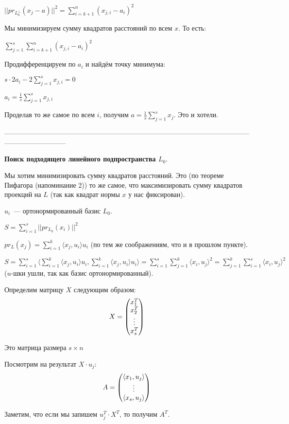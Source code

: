 $||pr_{L_0^{\perp}}(x_j-a)||^2 = \sum\limits_{i = k + 1}^n (x_{j, i} - a_i)^2$

Мы минимизируем сумму квадратов расстояний по всем $x$. То есть:

$\sum\limits_{j = 1}^s \sum\limits_{i = k + 1}^n (x_{j, i} - a_i)^2$

Продифференцируем по $a_i$ и найдём точку минимума:

$s\cdot 2a_i -2\sum\limits_{j=1}^s x_{j, i} = 0$

$a_i = \frac{1}{s} \sum\limits_{j=1}^s x_{j, i}$

Проделав то же самое по всем $i$, получим $a = \frac{1}{s} \sum\limits_{j=1}^s x_j$. Это и хотели.

\ethrm

---------------------------------------------------------------------------------------------------------------------------------------

{\bf Поиск подходящего линейного подпространства $L_0$}.

Мы хотим минимизировать сумму квадратов расстояний. Это (по теореме Пифагора (напоминание 2)) то же самое, что максимизировать сумму квадратов проекций на $L$ (так как квадрат нормы $x$ у нас фиксирован).

$u_i$~--- ортонормированный базис $L_0$.

$S = \sum\limits_{i = 1}^s ||pr_{L_0}(x_i)||^2$

$pr_L(x_j) = \sum\limits_{i = 1}^k \langle x_j, u_i\rangle u_i$ (по тем же соображениям, что и в прошлом пункте).

$S = \sum\limits_{i = 1}^s\langle\sum\limits_{i = 1}^k \langle x_j, u_i\rangle u_i, \sum\limits_{i = 1}^k \langle x_j, u_i\rangle u_i\rangle = \sum\limits_{i = 1}^s\sum\limits_{j = 1}^k \langle x_i, u_j\rangle^2 = \sum\limits_{j = 1}^k\sum\limits_{i = 1}^s \langle x_i, u_j\rangle^2$ ($u$-шки ушли, так как базис ортонормированный).

Определим матрицу $X$ следующим образом:
$$
X = \begin{pmatrix}
x_1^T\\
x_2^T\\
\vdots\\
x_s^T
\end{pmatrix}
$$

Это матрица размера $s\times n$

Посмотрим на результат $X\cdot u_j$:
$$
A=\begin{pmatrix}
\langle x_1, u_j\rangle\\
\vdots\\
\langle x_s, u_j\rangle
\end{pmatrix} 
$$

Заметим, что если мы запишем $u_j^T\cdot X^T$, то получим $A^T$.

